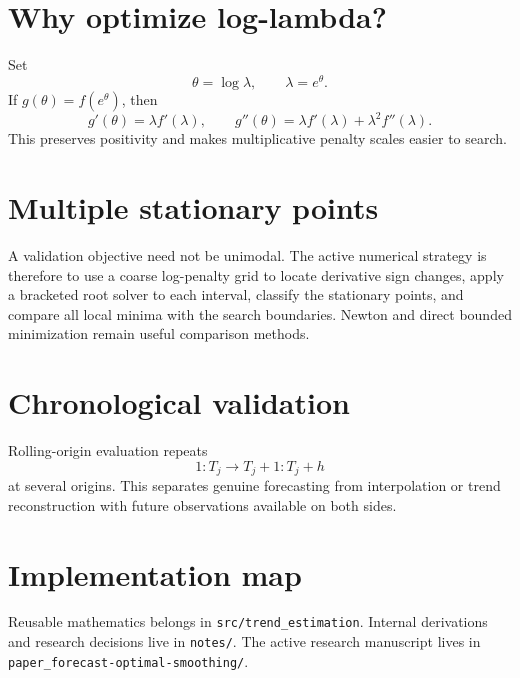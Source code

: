 \documentclass[11pt]{article}
\begin{document}
\section{Why optimize log-lambda?}
Set
\[
\theta=\log\lambda,
\qquad
\lambda=e^\theta.
\]
If $g(\theta)=f(e^\theta)$, then
\[
g'(\theta)=\lambda f'(\lambda),
\qquad
g''(\theta)=\lambda f'(\lambda)+\lambda^2f''(\lambda).
\]
This preserves positivity and makes multiplicative penalty scales easier to
search.

\section{Multiple stationary points}
A validation objective need not be unimodal. The active numerical strategy is
therefore to use a coarse log-penalty grid to locate derivative sign changes,
apply a bracketed root solver to each interval, classify the stationary points,
and compare all local minima with the search boundaries. Newton and direct
bounded minimization remain useful comparison methods.

\section{Chronological validation}
Rolling-origin evaluation repeats
\[
1{:}T_j
\longrightarrow
T_j{+}1{:}T_j{+}h
\]
at several origins. This separates genuine forecasting from interpolation or
trend reconstruction with future observations available on both sides.

\section{Implementation map}
Reusable mathematics belongs in \texttt{src/trend\_estimation}. Internal
derivations and research decisions live in \texttt{notes/}. The active
research manuscript lives in \texttt{paper\_forecast-optimal-smoothing/}.
\end{document}

